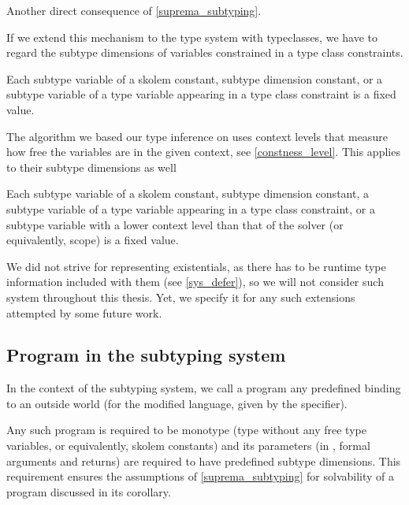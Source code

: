 \begin{remark}
    Another direct consequence of \cref{suprema_subtyping}.
\end{remark}

If we extend this mechanism to the type system with typeclasses, we have to regard the subtype dimensions of variables constrained in a type class constraints.

\begin{defn}
    Each subtype variable of a skolem constant, subtype dimension constant, or a subtype variable of a type variable appearing in a type class constraint is a fixed value.
\end{defn}


The algorithm we based our type inference on uses context levels that measure how free the variables are in the given context, see \cref{constness_level}. This applies to their subtype dimensions as well

\begin{defn}
    Each subtype variable of a skolem constant, subtype dimension constant, a subtype variable of a type variable appearing in a type class constraint, or a subtype variable with a lower context level than that of the solver (or equivalently, scope) is a fixed value.
\end{defn}

We did not strive for representing existentials, as there has to be runtime type information included with them (see \cref{sys_defer}), so we will not consider such system throughout this thesis. Yet, we specify it for any such extensions attempted by some future work.

\subsection{Program in the subtyping system}

In the context of the subtyping system, we call a program any predefined binding to an outside world (for the modified \cmm language, given by the  specifier).

Any such program is required to be monotype (type without any free type variables, or equivalently, skolem constants) and its parameters (in \cmm, formal arguments and returns) are required to have predefined subtype dimensions. This requirement ensures the assumptions of \cref{suprema_subtyping} for solvability of a program discussed in its corollary.

